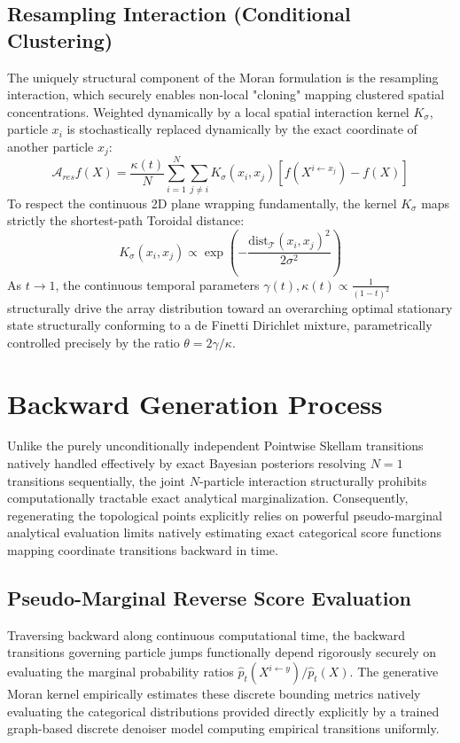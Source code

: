 \documentclass{article}
\begin{document}
\subsection{Resampling Interaction (Conditional Clustering)}
The uniquely structural component of the Moran formulation is the resampling interaction, which securely enables non-local "cloning" mapping clustered spatial concentrations. Weighted dynamically by a local spatial interaction kernel \(K_\sigma\), particle \(x_i\) is stochastically replaced dynamically by the exact coordinate of another particle \(x_j\):
\[
\mathcal{A}_{res} f(X) = \frac{\kappa(t)}{N} \sum_{i=1}^N \sum_{j \ne i} K_\sigma(x_i, x_j) \left[ f(X^{i \leftarrow x_j}) - f(X) \right]
\]
To respect the continuous 2D plane wrapping fundamentally, the kernel \(K_\sigma\) maps strictly the shortest-path Toroidal distance:
\[
K_\sigma(x_i, x_j) \propto \exp\left( -\frac{\text{dist}_\mathcal{T}(x_i, x_j)^2}{2\sigma^2} \right)
\]
As \(t \to 1\), the continuous temporal parameters \(\gamma(t), \kappa(t) \propto \frac{1}{(1-t)^2}\) structurally drive the array distribution toward an overarching optimal stationary state structurally conforming to a de Finetti Dirichlet mixture, parametrically controlled precisely by the ratio \(\theta = 2\gamma / \kappa\).

\section{Backward Generation Process}
Unlike the purely unconditionally independent Pointwise Skellam transitions natively handled effectively by exact Bayesian posteriors resolving \(N=1\) transitions sequentially, the joint \(N\)-particle interaction structurally prohibits computationally tractable exact analytical marginalization. Consequently, regenerating the topological points explicitly relies on powerful pseudo-marginal analytical evaluation limits natively estimating exact categorical score functions mapping coordinate transitions backward in time.

\subsection{Pseudo-Marginal Reverse Score Evaluation}
Traversing backward along continuous computational time, the backward transitions governing particle jumps functionally depend rigorously securely on evaluating the marginal probability ratios \(\hat{p}_t(X^{i \leftarrow y}) / \hat{p}_t(X)\). The generative Moran kernel empirically estimates these discrete bounding metrics natively evaluating the categorical distributions provided directly explicitly by a trained graph-based discrete denoiser model computing empirical transitions uniformly.
\end{document}
